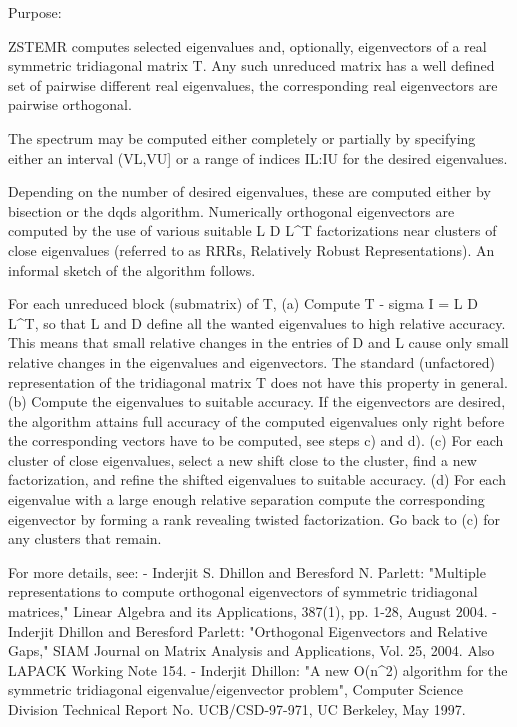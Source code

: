  \begin{DoxyParagraph}{Purpose\+: }
\begin{DoxyVerb} ZSTEMR computes selected eigenvalues and, optionally, eigenvectors
 of a real symmetric tridiagonal matrix T. Any such unreduced matrix has
 a well defined set of pairwise different real eigenvalues, the corresponding
 real eigenvectors are pairwise orthogonal.

 The spectrum may be computed either completely or partially by specifying
 either an interval (VL,VU] or a range of indices IL:IU for the desired
 eigenvalues.

 Depending on the number of desired eigenvalues, these are computed either
 by bisection or the dqds algorithm. Numerically orthogonal eigenvectors are
 computed by the use of various suitable L D L^T factorizations near clusters
 of close eigenvalues (referred to as RRRs, Relatively Robust
 Representations). An informal sketch of the algorithm follows.

 For each unreduced block (submatrix) of T,
    (a) Compute T - sigma I  = L D L^T, so that L and D
        define all the wanted eigenvalues to high relative accuracy.
        This means that small relative changes in the entries of D and L
        cause only small relative changes in the eigenvalues and
        eigenvectors. The standard (unfactored) representation of the
        tridiagonal matrix T does not have this property in general.
    (b) Compute the eigenvalues to suitable accuracy.
        If the eigenvectors are desired, the algorithm attains full
        accuracy of the computed eigenvalues only right before
        the corresponding vectors have to be computed, see steps c) and d).
    (c) For each cluster of close eigenvalues, select a new
        shift close to the cluster, find a new factorization, and refine
        the shifted eigenvalues to suitable accuracy.
    (d) For each eigenvalue with a large enough relative separation compute
        the corresponding eigenvector by forming a rank revealing twisted
        factorization. Go back to (c) for any clusters that remain.

 For more details, see:
 - Inderjit S. Dhillon and Beresford N. Parlett: "Multiple representations
   to compute orthogonal eigenvectors of symmetric tridiagonal matrices,"
   Linear Algebra and its Applications, 387(1), pp. 1-28, August 2004.
 - Inderjit Dhillon and Beresford Parlett: "Orthogonal Eigenvectors and
   Relative Gaps," SIAM Journal on Matrix Analysis and Applications, Vol. 25,
   2004.  Also LAPACK Working Note 154.
 - Inderjit Dhillon: "A new O(n^2) algorithm for the symmetric
   tridiagonal eigenvalue/eigenvector problem",
   Computer Science Division Technical Report No. UCB/CSD-97-971,
   UC Berkeley, May 1997.


\end{DoxyVerb}
\end{DoxyParagraph}
